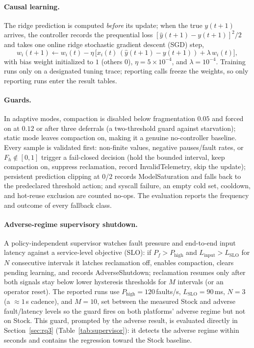 \paragraph{Causal learning.}
The ridge prediction is computed \emph{before} its update; when the true
$y(t{+}1)$ arrives, the controller records the prequential loss
$[\hat{y}(t{+}1)-y(t{+}1)]^2/2$ and takes one online ridge stochastic gradient
descent (SGD) step,
\begin{equation}
w_i(t{+}1) \leftarrow w_i(t) -
  \eta\,\bigl[x_i(t)\,(\hat{y}(t{+}1)-y(t{+}1)) + \lambda\, w_i(t)\bigr],
\end{equation}
with bias weight initialized to $1$ (others $0$), $\eta=5\times10^{-4}$, and
$\lambda=10^{-4}$. Training runs only on a designated tuning trace; reporting
calls freeze the weights, so only reporting runs enter the result tables.

\paragraph{Guards.}
In adaptive modes, compaction is disabled below fragmentation $0.05$ and forced
on at $0.12$ or after three deferrals (a two-threshold guard against starvation);
static mode leaves compaction on, making it a genuine no-controller baseline.
Every sample is validated first: non-finite values, negative pauses/fault rates,
or $F_h\notin[0,1]$ trigger a fail-closed decision (hold the bounded interval,
keep compaction on, suppress reclamation, record \textsf{InvalidTelemetry}, skip
the update); persistent prediction clipping at $0$/$2$ records
\textsf{ModelSaturation} and falls back to the predeclared threshold action; and
syscall failure, an empty cold set, cooldown, and hot-reuse exclusion are counted
no-ops. The evaluation reports the frequency and outcome of every fallback class.

\paragraph{Adverse-regime supervisory shutdown.}
A policy-independent supervisor watches fault pressure and end-to-end input
latency against a service-level objective (SLO): if $P_f>P_{\mathrm{high}}$ and
$L_{\mathrm{input}}>L_{\mathrm{SLO}}$ for
$N$ consecutive intervals it latches reclamation off, enables compaction, clears
pending learning, and records \textsf{AdverseShutdown}; reclamation resumes only
after both signals stay below lower hysteresis thresholds for $M$ intervals (or an
operator reset). The reported runs use $P_{\mathrm{high}}{=}120$\,faults/s,
$L_{\mathrm{SLO}}{=}90$\,ms, $N{=}3$ (a ${\approx}1$\,s cadence), and $M{=}10$, set
between the measured Stock and adverse fault/latency levels so the guard fires on
both platforms' adverse regime but not on Stock. This guard, prompted by
the adverse result, is evaluated directly
in Section~\ref{sec:rq3} (Table~\ref{tab:supervisor}): it detects the adverse
regime within seconds and contains the regression toward the Stock baseline.


